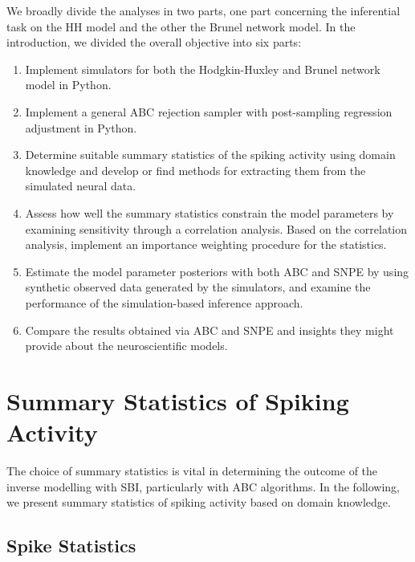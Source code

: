 We broadly divide the analyses in two parts, one part concerning the inferential task on the HH model and the other the Brunel network model. In the introduction, we divided the overall objective into six parts:
\begin{enumerate}
    \item Implement simulators for both the Hodgkin-Huxley and Brunel network model in Python. 
    \item Implement a general ABC rejection sampler with post-sampling regression adjustment in Python.
    \item Determine suitable summary statistics of the spiking activity using domain knowledge and develop or find methods for extracting them from the simulated neural data. 
    \item Assess how well the summary statistics constrain the model parameters by examining sensitivity through a correlation analysis. Based on the correlation analysis, implement an importance weighting procedure for the statistics. 
    \item Estimate the model parameter posteriors with both ABC and SNPE by using synthetic observed data generated by the simulators, and examine the performance of the simulation-based inference approach.
    \item Compare the results obtained via ABC and SNPE and insights they might provide about the neuroscientific models. 
\end{enumerate}


\section{Summary Statistics of Spiking Activity}

The choice of summary statistics is vital in determining the outcome of the inverse modelling with SBI, particularly with ABC algorithms. In the following, we present summary statistics of spiking activity based on domain knowledge.

\subsection{Spike Statistics}\label{sec:spike_statistics}

